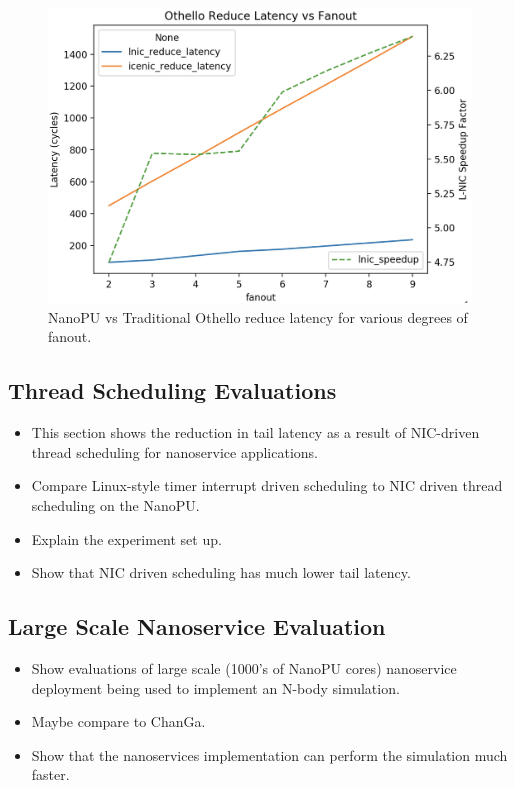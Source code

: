 \begin{figure}
  \includegraphics[width=\linewidth]{./figures/othello-reduce-latency}
  \caption{NanoPU vs Traditional Othello reduce latency for various degrees of fanout.}
  \label{fig:othello_reduce_latency}
\end{figure}

\subsection{Thread Scheduling Evaluations}
\begin{itemize}
    \item This section shows the reduction in tail latency as a result of NIC-driven thread scheduling for nanoservice applications.
    \item Compare Linux-style timer interrupt driven scheduling to NIC driven thread scheduling on the NanoPU.
    \item Explain the experiment set up.
    \item Show that NIC driven scheduling has much lower tail latency.
\end{itemize}

\subsection{Large Scale Nanoservice Evaluation}
\begin{itemize}
    \item Show evaluations of large scale (1000's of NanoPU cores) nanoservice deployment being used to implement an N-body simulation.
    \item Maybe compare to ChanGa.
    \item Show that the nanoservices implementation can perform the simulation much faster.
\end{itemize}
